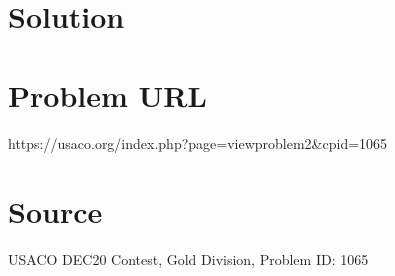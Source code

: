 \documentclass[12pt]{article}
\begin{document}
\section*{Solution}


\section*{Problem URL}
https://usaco.org/index.php?page=viewproblem2&cpid=1065

\section*{Source}
USACO DEC20 Contest, Gold Division, Problem ID: 1065
\end{document}
